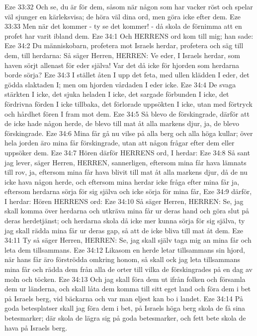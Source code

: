 Eze 33:32  Och se, du är för dem, såsom när någon som har vacker röst och spelar väl sjunger en kärleksvisa; de höra väl dina ord, men göra icke efter dem.
Eze 33:33  Men när det kommer - ty se det kommer! - då skola de förnimma att en profet har varit ibland dem.
Eze 34:1  Och HERRENS ord kom till mig; han sade:
Eze 34:2  Du människobarn, profetera mot Israels herdar, profetera och säg till dem, till herdarna: Så säger Herren, HERREN: Ve eder, I Israels herdar, som haven sörjt allenast för eder själva! Var det då icke för hjorden som herdarna borde sörja?
Eze 34:3  I stället åten I upp det feta, med ullen klädden I eder, det gödda slaktaden I; men om hjorden vårdaden I eder icke.
Eze 34:4  De svaga stärkten I icke, det sjuka heladen I icke, det sargade förbunden I icke, det fördrivna förden I icke tillbaka, det förlorade uppsökten I icke, utan med förtryck och hårdhet fören I fram mot dem.
Eze 34:5  Så blevo de förskingrade, därför att de icke hade någon herde, de blevo till mat åt alla markens djur, ja, de blevo förskingrade.
Eze 34:6  Mina får gå nu vilse på alla berg och alla höga kullar; över hela jorden äro mina får förskingrade, utan att någon frågar efter dem eller uppsöker dem.
Eze 34:7  Hören därför HERRENS ord, I herdar:
Eze 34:8  Så sant jag lever, säger Herren, HERREN, sannerligen, eftersom mina får hava lämnats till rov, ja, eftersom mina får hava blivit till mat åt alla markens djur, då de nu icke hava någon herde, och eftersom mina herdar icke fråga efter mina får ja, eftersom herdarna sörja för sig själva och icke sörja för mina får,
Eze 34:9  därför, I herdar: Hören HERRENS ord:
Eze 34:10  Så säger Herren, HERREN: Se, jag skall komma över herdarna och utkräva mina får ur deras hand och göra slut på deras herdetjänst; och herdarna skola då icke mer kunna sörja för sig själva, ty jag skall rädda mina får ur deras gap, så att de icke bliva till mat åt dem.
Eze 34:11  Ty så säger Herren, HERREN: Se, jag skall själv taga mig an mina får och leta dem tillsammans.
Eze 34:12  Likasom en herde letar tillsammans sin hjord, när hans får äro förströdda omkring honom, så skall ock jag leta tillsammans mina får och rädda dem från alla de orter till vilka de förskingrades på en dag av moln och töcken.
Eze 34:13  Och jag skall föra dem ut ifrån folken och församla dem ur länderna, och skall låta dem komma till sitt eget land och föra dem i bet på Israels berg, vid bäckarna och var man eljest kan bo i landet.
Eze 34:14  På goda betesplatser skall jag föra dem i bet, på Israels höga berg skola de få sina betesmarker; där skola de lägra sig på goda betesmarker, och fett bete skola de hava på Israels berg.

